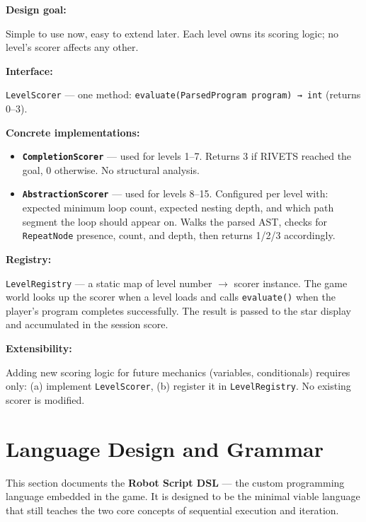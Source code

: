 \documentclass[12pt,a4paper]{article}
\newcommand{\gddfield}[2]{%
  \noindent\begin{minipage}[t]{3.5cm}\bfseries\color{accent}\sffamily#1\end{minipage}%
  \hspace{8pt}%
  \begin{minipage}[t]{\dimexpr\linewidth-3.5cm-8pt\relax}%
    #2
  \end{minipage}\par\smallskip}
\begin{document}
\begin{tcolorbox}[gddbox, title={LevelScorer Architecture}]
\gddfield{Design goal:}{Simple to use now, easy to extend later. Each level owns its scoring logic; no level's scorer affects any other.}

\vspace{4pt}
\gddfield{Interface:}{\texttt{LevelScorer} — one method: \texttt{evaluate(ParsedProgram program) → int} (returns 0--3).}

\vspace{4pt}
\gddfield{Concrete implementations:}{%
\begin{itemize}[noitemsep]
  \item \textbf{\texttt{CompletionScorer}} — used for levels 1--7. Returns 3 if RIVETS reached the goal, 0 otherwise. No structural analysis.
  \item \textbf{\texttt{AbstractionScorer}} — used for levels 8--15. Configured per level with: expected minimum loop count, expected nesting depth, and which path segment the loop should appear on. Walks the parsed AST, checks for \texttt{RepeatNode} presence, count, and depth, then returns 1/2/3 accordingly.
\end{itemize}
}

\vspace{4pt}
\gddfield{Registry:}{\texttt{LevelRegistry} — a static map of level number $\rightarrow$ scorer instance. The game world looks up the scorer when a level loads and calls \texttt{evaluate()} when the player's program completes successfully. The result is passed to the star display and accumulated in the session score.}

\vspace{4pt}
\gddfield{Extensibility:}{Adding new scoring logic for future mechanics (variables, conditionals) requires only: (a) implement \texttt{LevelScorer}, (b) register it in \texttt{LevelRegistry}. No existing scorer is modified.}
\end{tcolorbox}

\section{Language Design and Grammar}

This section documents the \textbf{Robot Script DSL} — the custom programming language embedded in the game. It is designed to be the minimal viable language that still teaches the two core concepts of sequential execution and iteration.
\end{document}
